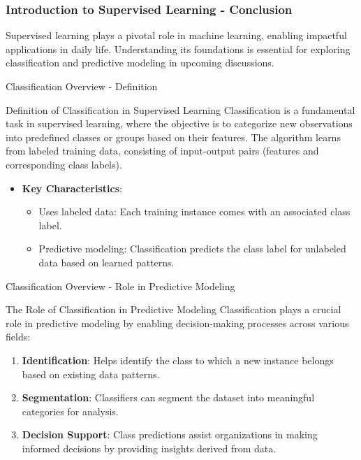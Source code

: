 \documentclass[aspectratio=169]{beamer}
\begin{document}
\begin{frame}[fragile]
    \frametitle{Introduction to Supervised Learning - Conclusion}
    Supervised learning plays a pivotal role in machine learning, enabling impactful applications in daily life. 
    Understanding its foundations is essential for exploring classification and predictive modeling in upcoming discussions.
\end{frame}

\begin{frame}[fragile]{Classification Overview - Definition}
    \begin{block}{Definition of Classification in Supervised Learning}
        Classification is a fundamental task in supervised learning, where the objective is to categorize new observations into predefined classes or groups based on their features. 
        The algorithm learns from labeled training data, consisting of input-output pairs (features and corresponding class labels).
    \end{block}
    
    \begin{itemize}
        \item \textbf{Key Characteristics}:
        \begin{itemize}
            \item Uses labeled data: Each training instance comes with an associated class label.
            \item Predictive modeling: Classification predicts the class label for unlabeled data based on learned patterns.
        \end{itemize}
    \end{itemize}
\end{frame}

\begin{frame}[fragile]{Classification Overview - Role in Predictive Modeling}
    \begin{block}{The Role of Classification in Predictive Modeling}
        Classification plays a crucial role in predictive modeling by enabling decision-making processes across various fields:
    \end{block}
    
    \begin{enumerate}
        \item \textbf{Identification}: Helps identify the class to which a new instance belongs based on existing data patterns.
        \item \textbf{Segmentation}: Classifiers can segment the dataset into meaningful categories for analysis.
        \item \textbf{Decision Support}: Class predictions assist organizations in making informed decisions by providing insights derived from data.
    \end{enumerate}
\end{frame}
\end{document}
